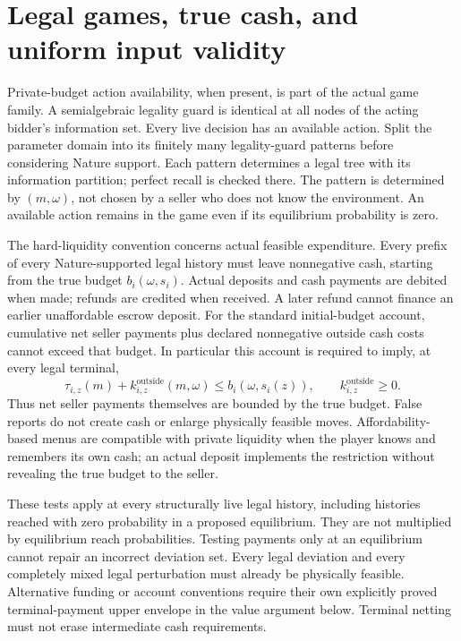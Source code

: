 \documentclass[11pt,a4paper]{article}
\numberwithin{equation}{section}
\theoremstyle{definition}
\begin{document}
\section{Legal games, true cash, and uniform input validity}\label{sec:validity}
Private-budget action availability, when present, is part of the actual
game family. A semialgebraic legality guard is identical at all nodes
of the acting bidder's information set.
Every live decision has an available action.
Split the parameter domain into its finitely many legality-guard
patterns before considering Nature support.
Each pattern determines a legal tree with its information partition;
perfect recall is checked there.
The pattern is determined by \((m,\omega)\), not chosen by a seller
who does not know the environment.
An available action remains in the game even if its equilibrium
probability is zero.

The hard-liquidity convention concerns actual feasible expenditure.
Every prefix of every Nature-supported legal history must leave
nonnegative cash, starting from the true budget \(b_i(\omega,s_i)\).
Actual deposits and cash payments are debited when made; refunds are
credited when received. A later refund cannot finance an earlier
unaffordable escrow deposit.
For the standard initial-budget account, cumulative net seller payments
plus declared nonnegative outside cash costs cannot exceed that budget.
In particular this account is required to imply, at every legal terminal,
\[
 \tau_{i,z}(m)+k_{i,z}^{\mathrm{outside}}(m,\omega)
 \le b_i(\omega,s_i(z)),\qquad
 k_{i,z}^{\mathrm{outside}}\ge0.
\]
Thus net seller payments themselves are bounded by the true budget.
False reports do not create cash or enlarge physically feasible moves.
Affordability-based menus are compatible with private liquidity when
the player knows and remembers its own cash; an actual deposit
implements the restriction without revealing the true budget to the seller.

These tests apply at every structurally live legal history, including
histories reached with zero probability in a proposed equilibrium.
They are not multiplied by equilibrium reach probabilities.
Testing payments only at an equilibrium cannot repair an incorrect
deviation set. Every legal deviation and every completely mixed legal
perturbation must already be physically feasible.
Alternative funding or account conventions require their own
explicitly proved terminal-payment upper envelope in the value argument
below. Terminal netting must not erase intermediate cash requirements.
\end{document}
